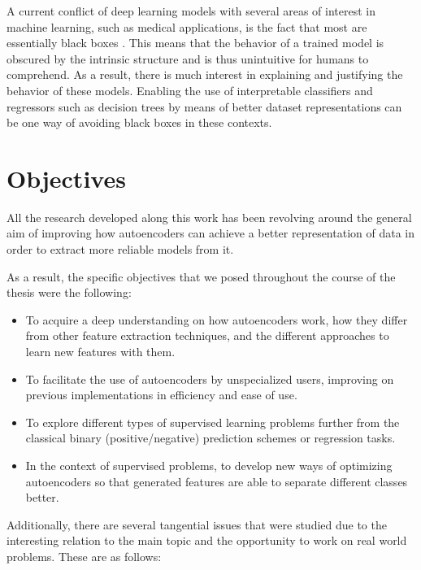 
A current conflict of deep learning models with several areas of interest in machine learning, such as medical applications, is the fact that most are essentially black boxes . This means that the behavior of a trained model is obscured by the intrinsic structure and is thus unintuitive for humans to comprehend. As a result, there is much interest in explaining and justifying the behavior of these models. Enabling the use of interpretable classifiers and regressors such as decision trees by means of better dataset representations can be one way of avoiding black boxes in these contexts.

\section{Objectives}\label{sec:objectives}

All the research developed along this work has been revolving around the general aim of improving how autoencoders can achieve a better representation of data in order to extract more reliable models from it. 

As a result, the specific objectives that we posed throughout the course of the thesis were the following:

\begin{itemize}
    \item To acquire a deep understanding on how autoencoders work, how they differ from other feature extraction techniques, and the different approaches to learn new features with them.
    \item To facilitate the use of autoencoders by unspecialized users, improving on previous implementations in efficiency and ease of use.
    \item To explore different types of supervised learning problems further from the classical binary (positive/negative) prediction schemes or regression tasks.
    \item In the context of supervised problems, to develop new ways of optimizing autoencoders so that generated features are able to separate different classes better.
\end{itemize}

Additionally, there are several tangential issues that were studied due to the interesting relation to the main topic and the opportunity to work on real world problems. These are as follows:


